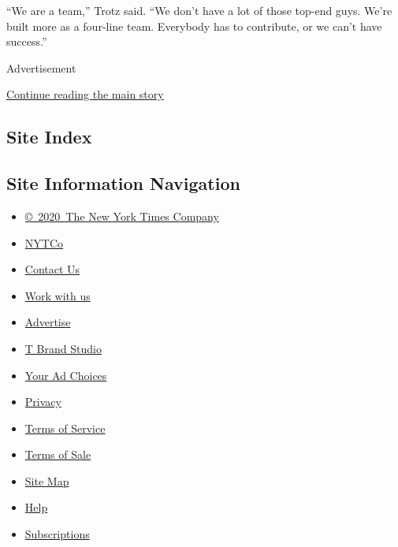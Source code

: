 ``We are a team,'' Trotz said. ``We don't have a lot of those top-end
guys. We're built more as a four-line team. Everybody has to contribute,
or we can't have success.''

Advertisement

\protect\hyperlink{after-bottom}{Continue reading the main story}

\hypertarget{site-index}{%
\subsection{Site Index}\label{site-index}}

\hypertarget{site-information-navigation}{%
\subsection{Site Information
Navigation}\label{site-information-navigation}}

\begin{itemize}
\tightlist
\item
  \href{https://help.nytimes3xbfgragh.onion/hc/en-us/articles/115014792127-Copyright-notice}{©~2020~The
  New York Times Company}
\end{itemize}

\begin{itemize}
\tightlist
\item
  \href{https://www.nytco.com/}{NYTCo}
\item
  \href{https://help.nytimes3xbfgragh.onion/hc/en-us/articles/115015385887-Contact-Us}{Contact
  Us}
\item
  \href{https://www.nytco.com/careers/}{Work with us}
\item
  \href{https://nytmediakit.com/}{Advertise}
\item
  \href{http://www.tbrandstudio.com/}{T Brand Studio}
\item
  \href{https://www.nytimes3xbfgragh.onion/privacy/cookie-policy\#how-do-i-manage-trackers}{Your
  Ad Choices}
\item
  \href{https://www.nytimes3xbfgragh.onion/privacy}{Privacy}
\item
  \href{https://help.nytimes3xbfgragh.onion/hc/en-us/articles/115014893428-Terms-of-service}{Terms
  of Service}
\item
  \href{https://help.nytimes3xbfgragh.onion/hc/en-us/articles/115014893968-Terms-of-sale}{Terms
  of Sale}
\item
  \href{https://spiderbites.nytimes3xbfgragh.onion}{Site Map}
\item
  \href{https://help.nytimes3xbfgragh.onion/hc/en-us}{Help}
\item
  \href{https://www.nytimes3xbfgragh.onion/subscription?campaignId=37WXW}{Subscriptions}
\end{itemize}
